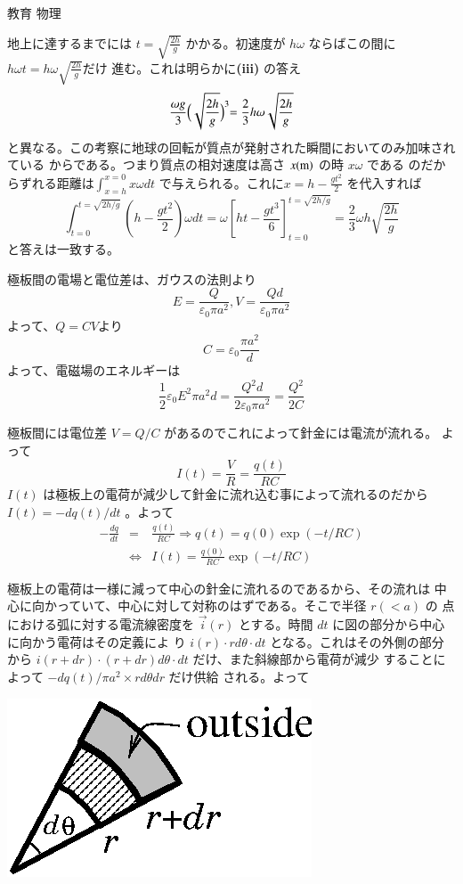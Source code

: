 \documentclass[fleqn]{jbook}
\begin{document}
\begin{answer}{教育 物理}{}
\begin{subanswers}
\begin{subsubanswers}
地上に達するまでには
${\displaystyle{ t = \sqrt{\frac{2h}{g}} }}$
かかる。初速度が $h\omega$ ならばこの間に
${\displaystyle{ h\omega t = h\omega \sqrt{\frac{2h}{g}} }}$だけ
進む。これは明らかに{\bf{(iii)}} の答え
\[ \frac{\omega g}{3}\Bigl( \sqrt{\frac{2h}{g}}\Bigl)^3 = \frac{2}{3}h\omega \sqrt{\frac{2h}{g}} \] 
と異なる。この考察に地球の回転が質点が発射された瞬間においてのみ加味されている
からである。つまり質点の相対速度は高さ $x{(\rm m)} $ の時 $ x \omega$ である
のだからずれる距離は$\displaystyle{\int_{x=h}^{x=0} x\omega dt}$
で与えられる。これに$\displaystyle{ x= h -\frac{gt^2}{2}}$
を代入すれば
\[
\int_{t=0}^{t=\sqrt{2h/g}} \left(h- \frac{gt^2}{2}\right)\omega dt
= \omega   [ ht - \frac{gt^3}{6}  ] _{t=0}^{t=\sqrt{2h/g}}
=\frac{2}{3} \omega h \sqrt{\frac{2h}{g}}
\]
と答えは一致する。
\end{subsubanswers}

\SubAnswer
\begin{subsubanswers}
\SubSubAnswer
極板間の電場と電位差は、ガウスの法則より
\[
E = \frac{Q}{\varepsilon _0 \pi a^2} ,V = \frac{Qd}{\varepsilon _0 \pi a^2}
\]
よって、$Q=CV$より
\[
C = \varepsilon _0 \frac{\pi a^2}{d}
\]
よって、電磁場のエネルギーは
\[
\frac{1}{2}\varepsilon _0E^2\pi a^2d = \frac{Q^2d}{2\varepsilon _0 \pi a^2}
= \frac{Q^2}{2C}
\]

\SubSubAnswer
極板間には電位差 $ V = Q/C $ があるのでこれによって針金には電流が流れる。
よって
\[ I(t)= \frac{V}{R} = \frac{q(t)}{RC} \]
$I(t) $ は極板上の電荷が減少して針金に流れ込む事によって流れるのだから
$ I(t)= -dq(t) / dt $ 。よって
\begin{eqnarray*}
- \frac{dq}{dt} & =& \frac{q(t)}{RC} \Rightarrow q(t) = q(0)\exp (-t/RC) \\
 & \Leftrightarrow & I(t)=\frac{q(0)}{RC}\exp \left(-t/RC\right)
\end{eqnarray*}

\SubSubAnswer
\parbox[t]{100mm}{
極板上の電荷は一様に減って中心の針金に流れるのであるから、その流れは
中心に向かっていて、中心に対して対称のはずである。そこで半径 $r(<a)$ の
点における弧に対する電流線密度を $\vec{i}(r)$ とする。時間 $dt$ に図の部分から中心に向かう電荷はその定義によ
り $i(r)\cdot r d\theta \cdot dt $ となる。これはその外側の部分から
 $i(r+dr) \cdot (r+dr)d\theta \cdot dt$ だけ、また斜線部から電荷が減少
することによって $-dq(t) / \pi a^{2} \times r d \theta dr $ だけ供給
される。よって

}\parbox[t]{60mm}{
\begin{center}
\includegraphics[clip]{1992phys-4-2.eps}
\end{center}
}


\end{subsubanswers}
\end{subanswers}
\end{answer}
\end{document}
